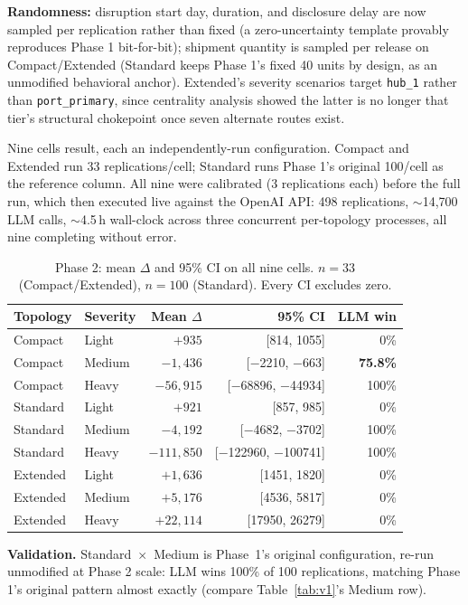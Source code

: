 \documentclass[10pt,twocolumn]{article}
\begin{document}
\textbf{Randomness:} disruption start day, duration, and disclosure delay are now sampled per replication rather than fixed (a zero-uncertainty template provably reproduces Phase 1 bit-for-bit); shipment quantity is sampled per release on Compact/Extended (Standard keeps Phase 1's fixed 40 units by design, as an unmodified behavioral anchor). Extended's severity scenarios target \texttt{hub\_1} rather than \texttt{port\_primary}, since centrality analysis showed the latter is no longer that tier's structural chokepoint once seven alternate routes exist.

Nine cells result, each an independently-run configuration. Compact and Extended run 33 replications/cell; Standard runs Phase 1's original 100/cell as the reference column. All nine were calibrated (3 replications each) before the full run, which then executed live against the OpenAI API: 498 replications, $\sim$14{,}700 LLM calls, $\sim$4.5\,h wall-clock across three concurrent per-topology processes, all nine completing without error.

\begin{table}[t]
\centering
\small
\begin{tabular}{@{}llrrr@{}}
\toprule
Topology & Severity & Mean $\Delta$ & 95\% CI & LLM win \\
\midrule
Compact  & Light  & $+935$ & [814, 1055]      & 0\% \\
Compact  & Medium & $-1{,}436$ & [$-$2210, $-$663] & \textbf{75.8\%} \\
Compact  & Heavy  & $-56{,}915$ & [$-$68896, $-$44934] & 100\% \\
Standard & Light  & $+921$ & [857, 985]        & 0\% \\
Standard & Medium & $-4{,}192$ & [$-$4682, $-$3702] & 100\% \\
Standard & Heavy  & $-111{,}850$ & [$-$122960, $-$100741] & 100\% \\
Extended & Light  & $+1{,}636$ & [1451, 1820]    & 0\% \\
Extended & Medium & $+5{,}176$ & [4536, 5817]    & 0\% \\
Extended & Heavy  & $+22{,}114$ & [17950, 26279]  & 0\% \\
\bottomrule
\end{tabular}
\caption{Phase 2: mean $\Delta$ and 95\% CI on all nine cells. $n=33$ (Compact/Extended), $n=100$ (Standard). Every CI excludes zero.}
\label{tab:v2}
\end{table}

\textbf{Validation.} Standard~$\times$~Medium is Phase~1's original configuration, re-run unmodified at Phase 2 scale: LLM wins 100\% of 100 replications, matching Phase 1's original pattern almost exactly (compare Table~\ref{tab:v1}'s Medium row).
\end{document}
